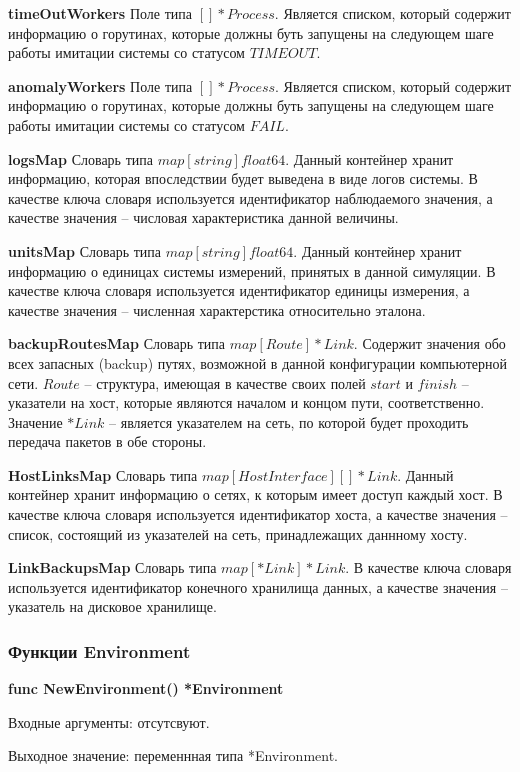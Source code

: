 \textbf{timeOutWorkers}   
Поле типа $[]*Process$. Является списком, который содержит информацию о горутинах, которые должны буть запущены на следующем шаге работы имитации системы со статусом $TIMEOUT$.

\textbf{anomalyWorkers}   
Поле типа $[]*Process$. Является списком, который содержит информацию о горутинах, которые должны буть запущены на следующем шаге работы имитации системы со статусом $FAIL$.

\textbf{logsMap}  
Словарь типа $map[string]float64$. Данный контейнер хранит информацию, которая впоследствии будет выведена в виде логов системы.  В качестве ключа словаря используется идентификатор наблюдаемого значения, а качестве значения -- числовая характеристика данной величины.

\textbf{unitsMap} 
Словарь типа $map[string]float64$. Данный контейнер хранит информацию о единицах системы измерений, принятых в данной симуляции. В качестве ключа словаря используется идентификатор единицы измерения, а качестве значения -- численная характерстика относительно эталона.

\textbf{backupRoutesMap} 
Словарь типа  $map[Route]*Link$. Содержит значения обо всех запасных (backup) путях, возможной в данной конфигурации компьютерной сети. $Route$ -- структура, имеющая в качестве своих полей $start$ и $finish$ -- указатели на хост, которые являются началом и концом пути, соответственно. Значение $*Link$ -- является указателем на сеть, по которой будет проходить передача пакетов в обе стороны.

\textbf{HostLinksMap}
Словарь типа $map[HostInterface][]*Link$. Данный контейнер хранит информацию о сетях, к которым имеет доступ каждый хост. В качестве ключа словаря используется идентификатор хоста, а качестве значения -- список, состоящий из указателей на сеть, принадлежащих даннному хосту.

\textbf{LinkBackupsMap}  
Словарь типа $map[*Link]*Link$.  В качестве ключа словаря используется идентификатор конечного хранилища данных, а качестве значения -- указатель на дисковое хранилище.

\subsubsection{Функции Environment}
\textbf{func NewEnvironment() *Environment}

Входные аргументы: отсутсвуют.

Выходное значение: переменнная типа *Environment.

